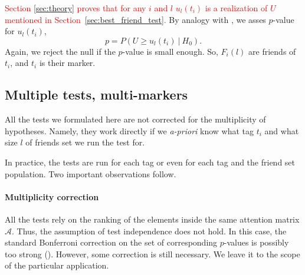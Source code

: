 \documentclass{llncs}
\begin{document}

 







\textcolor{red}{Section \ref{sec:theory} proves that for any $i$ and $l$ $u_l(t_i)$ is a realization of $U$ mentioned in Section~\ref{sec:best_friend_test}.}
By analogy with , we asses $p$-value for $u_{l}(t_i)$,
\[
p = P\left(U \ge u_l(t_i)~|~H_0\right). 
\]
Again, we reject the null if the $p$-value is small enough. So, $F_{i}(l)$ are friends of $t_i$, and $t_i$ is their marker.


\subsection{Multiple tests, multi-markers}
\label{sec:multimurkers}

All the tests we formulated here are not corrected for the multiplicity of hypotheses. Namely, they work directly if we \textit{a-priori} know what tag $t_i$ and what size $l$ of friends set we run the test for. 

In practice, the tests are run for each tag or even for each tag and the friend set population. Two important observations follow.

\paragraph*{Multiplicity correction} All the tests rely on the ranking of the elements inside the same attention matrix $\mathcal{A}$. Thus, the assumption of test independence does not hold. In this case, the standard Bonferroni correction on the set of corresponding $p$-values is possibly too strong (\cite{cabin2000bonferroni}). However, some correction is still necessary. We leave it to the scope of the particular application.
\end{document}
